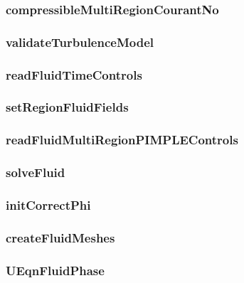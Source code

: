 \subsubsection*{compressibleMultiRegionCourantNo}

\subsubsection*{validateTurbulenceModel}

\subsubsection*{readFluidTimeControls}

\subsubsection*{setRegionFluidFields}

\subsubsection*{readFluidMultiRegionPIMPLEControls}

\subsubsection*{solveFluid}

\subsubsection*{initCorrectPhi}

\subsubsection*{createFluidMeshes}

\subsubsection*{UEqnFluidPhase}

